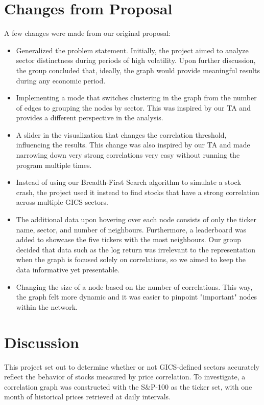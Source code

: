 \documentclass[fontsize=11pt]{article}
\begin{document}
\section*{Changes from Proposal}
A few changes were made from our original proposal:
\begin{itemize}
    \item Generalized the problem statement. Initially, the project aimed to analyze sector distinctness during periods of high volatility. Upon further discussion, the group concluded that, ideally, the graph would provide meaningful results during any economic period.
    \item Implementing a mode that switches clustering in the graph from the number of edges to grouping the nodes by sector. This was inspired by our TA and provides a different perspective in the analysis.
    \item A slider in the visualization that changes the correlation threshold, influencing the results. This change was also inspired by our TA and made narrowing down very strong correlations very easy without running the program multiple times.
    \item Instead of using our Breadth-First Search algorithm to simulate a stock crash, the project used it instead to find stocks that have a strong correlation across multiple GICS sectors.
    \item The additional data upon hovering over each node consists of only the ticker name, sector, and number of neighbours. Furthermore, a leaderboard was added to showcase the five tickers with the most neighbours. Our group decided that data such as the log return was irrelevant to the representation when the graph is focused solely on correlations, so we aimed to keep the data informative yet presentable.
    \item Changing the size of a node based on the number of correlations. This way, the graph felt more dynamic and it was easier to pinpoint "important" nodes within the network.
\end{itemize}

\section*{Discussion}
This project set out to determine whether or not GICS-defined sectors accurately reflect the behavior of stocks measured by price correlation. To investigate, a correlation graph was constructed with the S\&P-100 as the ticker set, with one month of historical prices retrieved at daily intervals.\\\\
\end{document}
